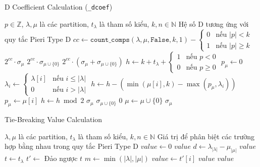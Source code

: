 \begin{algorithm}[H]
\caption{D Coefficient Calculation (\texttt{\_dcoef})}
\begin{algorithmic}[1]
\REQUIRE $p \in \mathbb{Z}$, $\lambda, \mu$ là các partition, $t_\lambda$ là tham số kiểu, $k, n \in \mathbb{N}$
\ENSURE Hệ số D tương ứng với quy tắc Pieri Type D
\STATE $cc \gets \mathtt{count\_comps}(\lambda, \mu, \mathtt{False}, k, 1) - \begin{cases}
0 & \text{nếu } |p| < k \\
1 & \text{nếu } |p| \geq k
\end{cases}$
        \RETURN $2^{cc} \cdot \sigma_\mu$
        \RETURN $2^{cc} \cdot \sigma_{\mu \cup \{0\}}$
    \ELSE
        \RETURN $2^{cc} \cdot (\sigma_\mu + \sigma_{\mu \cup \{0\}})$
    \ENDIF
\ENDIF
{}
\STATE $h \gets k + t_\lambda + \begin{cases}
1 & \text{nếu } p < 0 \\
0 & \text{nếu } p \geq 0
\end{cases}$
\STATE $p_{\mu} \gets 0$
    \STATE $\lambda_i \gets \begin{cases}
    \lambda[i] & \text{nếu } i \leq |\lambda| \\
    0 & \text{nếu } i > |\lambda|
    \end{cases}$
        \STATE $h \gets h - (\min(\mu[i], k) - \max(p_{\mu}, \lambda_i))$
    \ENDIF
    \STATE $p_{\mu} \gets \mu[i]$
\ENDFOR
\STATE $h \gets h \bmod 2$
        \RETURN $\sigma_\mu$
    \ELSE
        \RETURN $\sigma_{\mu \cup \{0\}}$
    \ENDIF
\ENDIF
{}
    \RETURN $0$
\ENDIF
{}
    \STATE $\mu \gets \mu \cup \{0\}$
\ENDIF
\RETURN $\sigma_\mu$
\end{algorithmic}
\end{algorithm}

\begin{algorithm}[H]
\caption{Tie-Breaking Value Calculation}
\begin{algorithmic}[1]
\REQUIRE $\lambda, \mu$ là các partition, $t_\lambda$ là tham số kiểu, $k, n \in \mathbb{N}$
\ENSURE Giá trị để phân biệt các trường hợp bằng nhau trong quy tắc Pieri Type D
\STATE $value \gets 0$
\IF{$\lambda = \mu$}
    \RETURN $value$
\ENDIF
\STATE $d \gets \lambda_{|\lambda|} - \mu_{|\mu|}$
    \RETURN $value$
\ENDIF
\STATE $t \gets t_\lambda$
\STATE $t' \gets$ Đảo ngược $t$
\STATE $m \gets \min(|\lambda|, |\mu|)$
    \IF{$\lambda[i] \neq \mu[i]$}
        \STATE $value \gets t'[i]$
        \RETURN $value$
    \ENDIF
\ENDFOR
\RETURN $value$
\end{algorithmic}
\end{algorithm}




